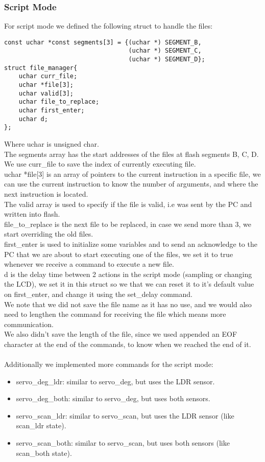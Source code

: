 \documentclass{article}
\begin{document}
\subsubsection{Script Mode}
For script mode we defined the following struct to handle the files:
\begin{lstlisting} 
const uchar *const segments[3] = {(uchar *) SEGMENT_B,
                                  (uchar *) SEGMENT_C,
                                  (uchar *) SEGMENT_D};
struct file_manager{
	uchar curr_file;
	uchar *file[3];
	uchar valid[3];
	uchar file_to_replace;
	uchar first_enter;
	uchar d;
};
\end{lstlisting}
Where uchar is unsigned char.\\
The segments array has the start addresses of the files at flash segments B, C, D.\\
We use curr\_file to save the index of currently executing file.\\
uchar *file[3] is an array of pointers to the current instruction in a specific file, we can use the current instruction to know the number of arguments, and where the next instruction is located.\\
The valid array is used to specify if the file is valid, i.e was sent by the PC and written into flash.\\
file\_to\_replace is the next file to be replaced, in case we send more than 3, we start overriding the old files.\\
first\_enter is used to initialize some variables and to send an acknowledge to the PC that we are about to start executing one of the files, we set it to true whenever we receive a command to execute a new file.\\
d is the delay time between 2 actions in the script mode (sampling or changing the LCD), we set it in this struct so we that we can reset it to it's default value on first\_enter, and change it using the set\_delay command.\\
We note that we did not save the file name as it has no use, and we would also need to lengthen the command for receiving the file which means more communication.\\
We also didn't save the length of the file, since we used appended an EOF character at the end of the commands, to know when we reached the end of it.\\
\\Additionally we implemented more commands for the script mode:
\begin{itemize}
    \item servo\_deg\_ldr: similar to servo\_deg, but uses the LDR sensor.
    \item servo\_deg\_both: similar to servo\_deg, but uses both sensors.
    \item servo\_scan\_ldr: similar to servo\_scan, but uses the LDR sensor (like scan\_ldr state).
    \item servo\_scan\_both: similar to servo\_scan, but uses both sensors (like scan\_both state).
\end{itemize}
\end{document}
